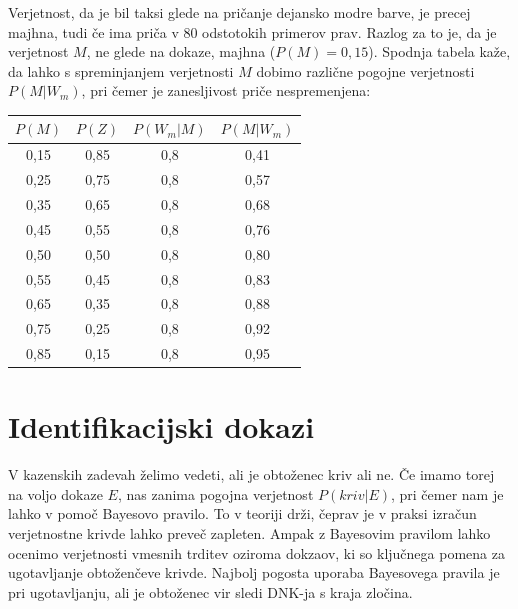 \documentclass[12pt,a4paper]{amsart}
\theoremstyle{definition} %
\theoremstyle{plain} %
\begin{document}
Verjetnost, da je bil taksi glede na pričanje dejansko modre barve, je precej majhna, tudi če ima priča v 80 odstotokih primerov prav. Razlog za to je, 
da je verjetnost $M$, ne glede na dokaze, majhna ($P(M)=0,15$). Spodnja tabela kaže, da lahko s spreminjanjem verjetnosti $M$ dobimo različne pogojne 
verjetnosti $P(M \lvert W_m)$, pri čemer je zanesljivost priče nespremenjena:

\begin{table}[h!]
\centering
\begin{tabular}{c c c c} 
\hline
$P(M)$ & $P(Z)$ & $P(W_m \lvert M)$ & $P(M \lvert W_m)$ \\ 
\hline
0,15 & 0,85 & 0,8 & 0,41 \\
0,25 & 0,75 & 0,8 & 0,57 \\
0,35 & 0,65 & 0,8 & 0,68 \\
0,45 & 0,55 & 0,8 & 0,76 \\
0,50 & 0,50 & 0,8 & 0,80 \\
0,55 & 0,45 & 0,8 & 0,83 \\
0,65 & 0,35 & 0,8 & 0,88 \\
0,75 & 0,25 & 0,8 & 0,92 \\
0,85 & 0,15 & 0,8 & 0,95 \\
\hline
\end{tabular} \vspace{3mm}
\end{table}
\section{Identifikacijski dokazi}
V kazenskih zadevah želimo vedeti, ali je obtoženec kriv ali ne. Če imamo torej na voljo dokaze $E$, nas zanima pogojna verjetnost 
$P(kriv \lvert E)$, pri čemer nam je lahko v pomoč Bayesovo pravilo. To v teoriji drži, čeprav je v praksi izračun verjetnostne krivde lahko 
preveč zapleten. Ampak z Bayesovim pravilom lahko ocenimo verjetnosti vmesnih trditev oziroma dokzaov, ki so ključnega pomena za ugotavljanje 
obtoženčeve krivde. Najbolj pogosta uporaba Bayesovega pravila je pri ugotavljanju, ali je obtoženec vir sledi DNK-ja s kraja zločina. \\

\end{document}
